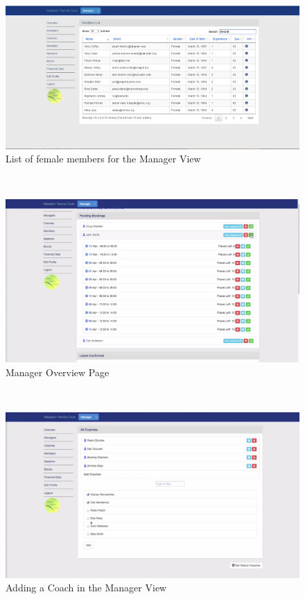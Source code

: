 \documentclass{l3proj}
\begin{document}
\\
{
\begin{figure}[h]
\caption{List of female members for the Manager View}
\centering
\includegraphics[scale=0.40]{managerlistofMembersFemale.jpg}
\end{figure}
}
\\
{
\begin{figure}[h]
\caption{Manager Overview Page}
\centering
\includegraphics[scale=0.30]{managerOverview.jpg}
\end{figure}
}
\\
{
\begin{figure}[h]
\caption{Adding a Coach in the Manager View}
\centering
\includegraphics[scale=0.30]{managerCoachList.jpg}
\end{figure}
}
\end{document}
